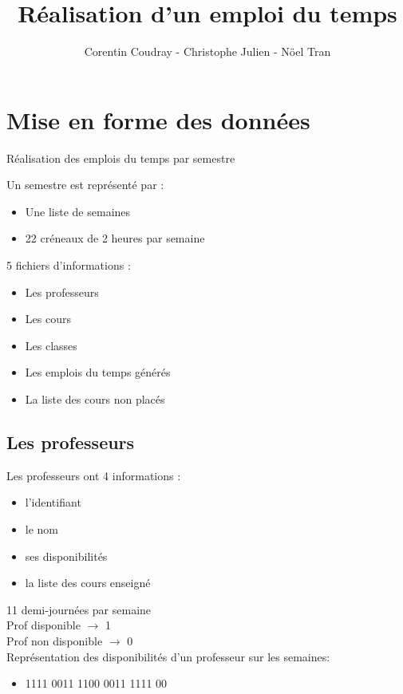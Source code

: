 \documentclass{beamer}
\title{Réalisation d'un emploi du temps}
\author{Corentin Coudray - Christophe Julien - Nöel Tran}
\institute{ESME SUDRIA}
\begin{document}
\begin{frame}
\titlepage
\end{frame}

\section{Mise en forme des données}

\begin{frame}
Réalisation des emplois du temps par semestre

Un semestre est représenté par :
\begin{itemize}
\item Une liste de semaines
\item 22 créneaux de 2 heures par semaine
\end{itemize}
\end{frame}

\begin{frame}
5 fichiers d'informations : 
\begin{itemize}
\item Les professeurs
\item Les cours
\item Les classes
\item Les emplois du temps générés
\item La liste des cours non placés
\end{itemize}
\end{frame}

\subsection{Les professeurs}
\begin{frame} 
Les professeurs ont 4 informations : 
\begin{itemize}
\item l'identifiant
\item le nom
\item ses disponibilités
\item la liste des cours enseigné
\end{itemize}
\end{frame}

\begin{frame}
11 demi-journées par semaine\\
\vspace{\baselineskip}
Prof disponible  $\rightarrow$ 1\\
Prof non disponible  $\rightarrow$ 0\\
\vspace{\baselineskip}
Représentation des disponibilités d'un professeur sur les semaines:
\begin{itemize}
\item 1111 0011 1100 0011 1111 00
\end{itemize}
\end{frame}
\end{document}
